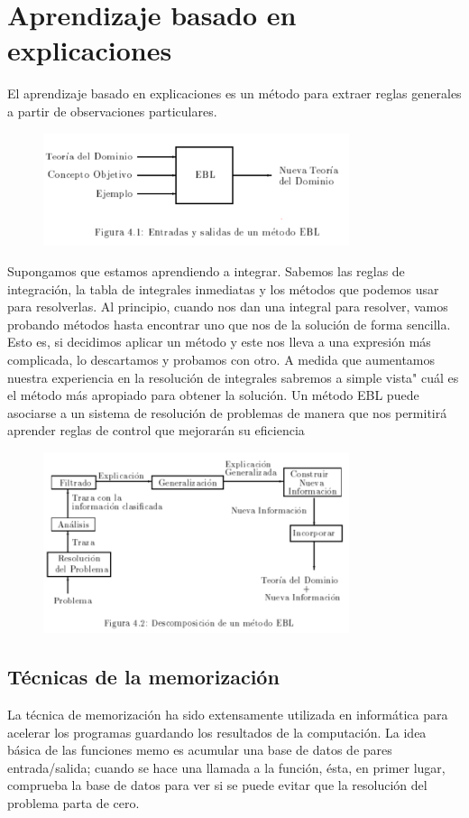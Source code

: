 \documentclass[12 pt, a4paper]{article}
\begin{document}
	 \section{Aprendizaje basado en explicaciones}
	 		El aprendizaje basado en explicaciones es un método para extraer reglas generales a partir de observaciones particulares.
	 			\begin{figure}[h]
					\centering
					\includegraphics[width=0.8\textwidth]{./section2/fig6.png}
				\end{figure}
	 		Supongamos que estamos aprendiendo a integrar. Sabemos las reglas de integración, la tabla de integrales inmediatas y los métodos que podemos usar para resolverlas. Al principio, cuando nos dan una integral para resolver, vamos probando métodos hasta encontrar uno que nos de la solución de forma sencilla. Esto es, si decidimos aplicar un método y este nos lleva a una expresión más complicada, lo descartamos y probamos con otro. A medida que aumentamos nuestra experiencia en la resolución de integrales sabremos a simple vista" cuál es el método más apropiado para obtener la solución. Un método EBL puede asociarse a un sistema de resolución de problemas de manera que nos permitirá aprender reglas de control que mejorarán su eficiencia
	 			\begin{figure}[h]
					\centering
					\includegraphics[width=0.8\textwidth]{./section2/fig7.png}
				\end{figure}
	 		\subsection{Técnicas de la memorización}
	 		La técnica de memorización ha sido extensamente utilizada en informática para acelerar los programas guardando los resultados de la computación. La idea básica de las funciones memo es acumular una base de datos de pares entrada/salida; cuando se hace una llamada a la función, ésta, en primer lugar, comprueba la base de datos para ver si se puede evitar que la resolución del problema parta de cero.
	 		
\end{document}
